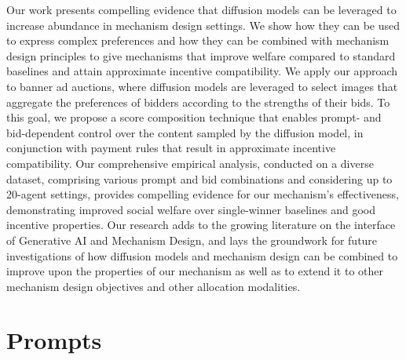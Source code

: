 \documentclass[format=acmsmall, review=false]{acmart}
\begin{document}
Our work presents compelling evidence that diffusion models can be leveraged to increase abundance in mechanism design settings. We show how they can be used to express complex preferences and how they can be combined with mechanism design principles to give mechanisms that improve welfare compared to standard baselines and attain approximate incentive compatibility. We apply our approach to banner ad auctions, where diffusion models are leveraged to select images that aggregate the preferences of bidders according to the strengths of their bids. To this goal, we propose a score composition technique that enables prompt- and bid-dependent control over the content sampled by the diffusion model, in conjunction with payment rules that result in approximate incentive compatibility. Our comprehensive empirical analysis, conducted on a diverse dataset, comprising various prompt and bid combinations and considering up to 20-agent settings, provides compelling evidence for our mechanism's effectiveness, demonstrating improved social welfare over single-winner baselines and good incentive properties. Our research adds to the growing literature on the interface of Generative AI and Mechanism Design, and lays the groundwork for future investigations of how diffusion models and mechanism design can be combined to improve upon the properties of our mechanism as well as to extend it to other mechanism design objectives and other allocation modalities. 

%
%
%
%
%



\newpage
\appendix

\section{Prompts}
\label{app:prompts}
\end{document}
